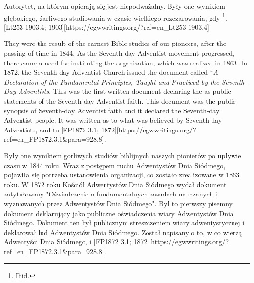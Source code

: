 Autorytet, na którym opierają się  jest niepodważalny. Były one wynikiem głębokiego, żarliwego studiowania w czasie wielkiego rozczarowania, gdy \footnote{Ibid.}. [Lt253-1903.4; 1903][https://egwwritings.org/?ref=en\_Lt253-1903.4]


They were the result of the earnest Bible studies of our pioneers, after the passing of time in 1844. As the Seventh-day Adventist movement progressed, there came a need for instituting the organization, which was realized in 1863. In 1872, the Seventh-day Adventist Church issued the document called “\textit{A Declaration of the Fundamental Principles, Taught and Practiced by the Seventh-Day Adventists}. This was the first written document declaring the  as public statements of the Seventh-day Adventist faith. This document was the public synopsis of Seventh-day Adventist faith and it declared  the Seventh-day Adventist people. It was written  as to what was believed by Seventh-day Adventists,  and to [FP1872 3.1; 1872][https://egwwritings.org/?ref=en\_FP1872.3.1&para=928.8].


Były one wynikiem gorliwych studiów biblijnych naszych pionierów po upływie czasu w 1844 roku. Wraz z postępem ruchu Adwentystów Dnia Siódmego, pojawiła się potrzeba ustanowienia organizacji, co zostało zrealizowane w 1863 roku. W 1872 roku Kościół Adwentystów Dnia Siódmego wydał dokument zatytułowany "Oświadczenie o fundamentalnych zasadach nauczanych i wyznawanych przez Adwentystów Dnia Siódmego". Był to pierwszy pisemny dokument deklarujący  jako publiczne oświadczenia wiary Adwentystów Dnia Siódmego. Dokument ten był publicznym streszczeniem wiary adwentystycznej i deklarował  lud Adwentystów Dnia Siódmego. Został napisany  o to, w co wierzą Adwentyści Dnia Siódmego,  i [FP1872 3.1; 1872][https://egwwritings.org/?ref=en\_FP1872.3.1&para=928.8].


